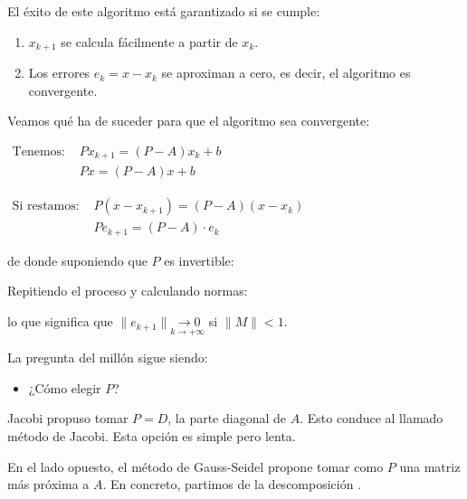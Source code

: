 \documentclass[12pt]{article}
\begin{document}

El éxito de este algoritmo está garantizado si se cumple:
\begin{enumerate}[label=\arabic*)]
    \item $x_{k+1}$ se calcula fácilmente a partir de $x_{k}$.
    \item Los errores $e_{k}=x-x_{k}$ se aproximan a cero, es decir, el algoritmo es convergente.
\end{enumerate}
Veamos qué ha de suceder para que el algoritmo sea convergente:

$\begin{array}{ll}
\text{Tenemos: } & Px_{k+1}=(P-A)x_{k}+b\\
 & Px=(P-A)x+b
\end{array}$

$\begin{array}{ll}
\text{Si restamos: } & P(x-x_{k+1})=(P-A)(x-x_{k})\\
 & Pe_{k+1}=(P-A)\cdot e_{k}
\end{array}$

de donde suponiendo que $P$ es invertible: 
\begin{center}
\end{center}

Repitiendo el proceso y calculando normas:\begin{center}
\end{center} lo que significa que $\|e_{k+1}\|\underset{k\rightarrow +\infty}{\longrightarrow 0}$ si $\|M\|<1$.

La pregunta del millón sigue siendo:
\begin{itemize}[label=\color{red}\textbullet, leftmargin=*]
    \item \color{lightblue} ¿Cómo elegir $P$?
\end{itemize}
Jacobi propuso tomar $P=D$, la parte diagonal de $A$. Esto conduce al llamado método de Jacobi. Esta opción es simple pero lenta.

En el lado opuesto, el método de Gauss-Seidel propone tomar como $P$ una matriz más próxima a $A$. En concreto, partimos de la descomposición .
\end{document}
